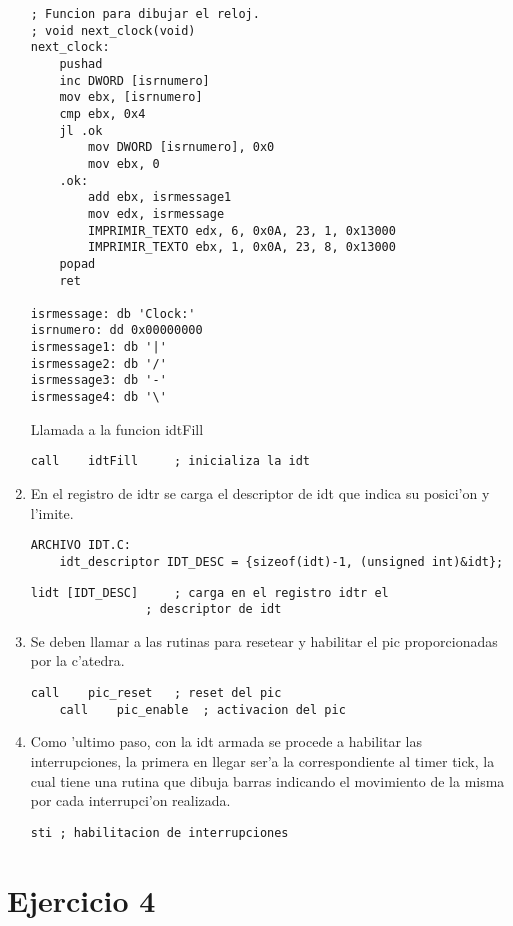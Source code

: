 \documentclass[11pt]{article}
\begin{document}
\begin{enumerate}
\begin{lstlisting}[frame=single]
; Funcion para dibujar el reloj.
; void next_clock(void)
next_clock:
	pushad
	inc DWORD [isrnumero]
	mov ebx, [isrnumero]
	cmp ebx, 0x4
	jl .ok
		mov DWORD [isrnumero], 0x0
		mov ebx, 0
	.ok:
		add ebx, isrmessage1
		mov edx, isrmessage
		IMPRIMIR_TEXTO edx, 6, 0x0A, 23, 1, 0x13000
		IMPRIMIR_TEXTO ebx, 1, 0x0A, 23, 8, 0x13000
	popad
	ret

isrmessage: db 'Clock:'
isrnumero: dd 0x00000000
isrmessage1: db '|'
isrmessage2: db '/'
isrmessage3: db '-'
isrmessage4: db '\'
\end{lstlisting}
Llamada a la funcion idtFill
\begin{lstlisting}[frame=single]
	call	idtFill		; inicializa la idt
\end{lstlisting}

\item
En el registro de idtr se carga el descriptor de idt que indica su posici'on y l'imite.
\begin{lstlisting}[frame=single]
ARCHIVO IDT.C:
	idt_descriptor IDT_DESC = {sizeof(idt)-1, (unsigned int)&idt};
\end{lstlisting}
\begin{lstlisting}[frame=single]
	lidt [IDT_DESC]		; carga en el registro idtr el
				; descriptor de idt
\end{lstlisting}

\item
Se deben llamar a las rutinas para resetear y habilitar el pic proporcionadas por la c'atedra.
\begin{lstlisting}[frame=single]
	call	pic_reset	; reset del pic
	call	pic_enable	; activacion del pic
\end{lstlisting}

\item
Como 'ultimo paso, con la idt armada se procede a habilitar las interrupciones, la primera en llegar ser'a la correspondiente al timer tick, la cual tiene una rutina que dibuja barras indicando el movimiento de la misma por cada interrupci'on realizada.
\begin{lstlisting}[frame=single]
	sti	; habilitacion de interrupciones
\end{lstlisting}

\end{enumerate}

\newpage

\section{Ejercicio 4}
\end{document}
